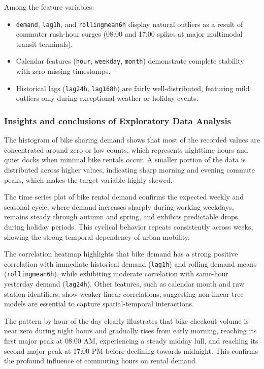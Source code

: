 \documentclass[12pt, a4paper]{article}
\renewcommand{\_}{\textunderscore\allowbreak}
\begin{document}
Among the feature variables:
\begin{itemize}
    \item \texttt{demand}, \texttt{lag\_1h}, and \texttt{rolling\_mean\_6h} display natural outliers as a result of commuter rush-hour surges (08:00 and 17:00 spikes at major multimodal transit terminals).
    \item Calendar features (\texttt{hour}, \texttt{weekday}, \texttt{month}) demonstrate complete stability with zero missing timestamps.
    \item Historical lags (\texttt{lag\_24h}, \texttt{lag\_168h}) are fairly well-distributed, featuring mild outliers only during exceptional weather or holiday events.
\end{itemize}

\subsubsection{Insights and conclusions of Exploratory Data Analysis}

The histogram of bike sharing demand shows that most of the recorded values are concentrated around zero or low counts, which represents nighttime hours and quiet docks when minimal bike rentals occur. A smaller portion of the data is distributed across higher values, indicating sharp morning and evening commute peaks, which makes the target variable highly skewed.

The time series plot of bike rental demand confirms the expected weekly and seasonal cycle, where demand increases sharply during working weekdays, remains steady through autumn and spring, and exhibits predictable drops during holiday periods. This cyclical behavior repeats consistently across weeks, showing the strong temporal dependency of urban mobility.

The correlation heatmap highlights that bike demand has a strong positive correlation with immediate historical demand (\texttt{lag\_1h}) and rolling demand means (\texttt{rolling\_mean\_6h}), while exhibiting moderate correlation with same-hour yesterday demand (\texttt{lag\_24h}). Other features, such as calendar month and raw station identifiers, show weaker linear correlations, suggesting non-linear tree models are essential to capture spatial-temporal interactions.

The pattern by hour of the day clearly illustrates that bike checkout volume is near zero during night hours and gradually rises from early morning, reaching its first major peak at 08:00 AM, experiencing a steady midday lull, and reaching its second major peak at 17:00 PM before declining towards midnight. This confirms the profound influence of commuting hours on rental demand.
\end{document}
